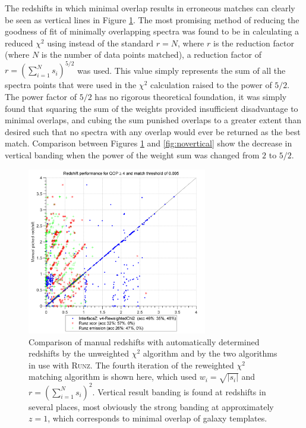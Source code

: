 \documentclass[titlesmallcaps, examinerscopy, copyrightpage]{uqthesis}
\newcommand{\runz}{\textsc{Runz}}
\newcommand{\brac}[1]{\left( #1 \right)}
\newcommand\abs[1]{\left|#1\right|}
\begin{document}
The redshifts in which minimal overlap results in erroneous matches can clearly be seen as vertical lines in Figure \ref{fig:vertical}. The most promising method of reducing the goodness of fit of minimally overlapping spectra was found to be in calculating a reduced $\chi^2$ using instead of the standard $r = N$, where $r$ is the reduction factor (where $N$ is the number of data points matched), a reduction factor of $r = \brac{\sum_{i=1}^N s_i}^{5/2}$ was used. This value simply represents the sum of all the spectra points that were used in the $\chi^2$ calculation raised to the power of $5/2$. The power factor of $5/2$ has no rigorous theoretical foundation, it was simply found that squaring the sum of the weights provided insufficient disadvantage to minimal overlaps, and cubing the sum punished overlaps to a greater extent than desired such that no spectra with any overlap would ever be returned as the best match. Comparison between Figures \ref{fig:vertical} and \ref{fig:novertical} show the decrease in vertical banding when the power of the weight sum was changed from $2$ to $5/2$.

\begin{figure}[ht!]
\includegraphics[width=0.7\textwidth]{images/Fullv4-ReweightedChi2.png} 
\centering
\caption{Comparison of manual redshifts with automatically determined redshifts by the unweighted $\chi^2$ algorithm and by the two algorithms in use with \runz{}. The fourth iteration of the reweighted $\chi^2$ matching algorithm is shown here, which used $w_i = \sqrt{\abs{s_i}}$ and $r = \brac{\sum_{i=1}^N s_i}^{2}$. Vertical result banding is found at redshifts in several places, most obviously the strong banding at approximately $z=1$, which corresponds to minimal overlap of galaxy templates.}
\label{fig:vertical}
\end{figure}
\end{document}
